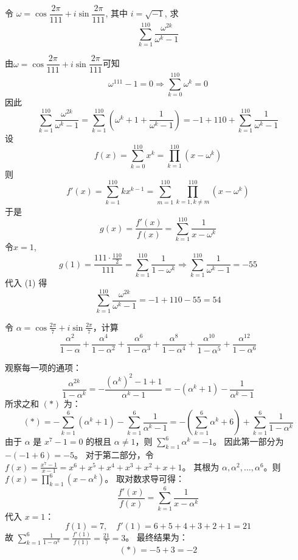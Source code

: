 \begin{questions}
    \question 令 $\omega = \cos\dfrac{2\pi}{111} + i \sin\dfrac{2\pi}{111}$, 其中 $i = \sqrt{-1}$, 求 \[ 
    \sum_{k=1}^{110} \frac{\omega^{2k}}{\omega^k - 1}
    \]
    \begin{solution}
        由$\omega = \cos\dfrac{2\pi}{111} + i \sin\dfrac{2\pi}{111}$可知
        \[
        \omega^{111}-1 = 0 \Rightarrow \sum_{k=0}^{110} \omega^k = 0
        \]
        因此
        \[
        \sum_{k=1}^{110} \frac{\omega^{2k}}{\omega^k - 1} = \sum_{k=1}^{110} \left(\omega^k + 1 + \frac{1}{\omega^k - 1}\right) = -1 + 110 + \sum_{k=1}^{110} \frac{1}{\omega^k - 1} \tag{1}
        \]
        设 
        \[f(x) = \sum_{k=0}^{110} x^k = \prod_{k=1}^{110} (x - \omega^k)
        \]
        则
        \[ f'(x) = \sum_{k=1}^{110} k x^{k-1} = \sum_{m=1}^{110} \prod_{k=1, k\ne m}^{110} (x - \omega^k)
        \]
        于是
        \[
        g(x) = \frac{f'(x)}{f(x)} = \sum_{k=1}^{110} \frac{1}{x - \omega^k}
        \]
        令$x=1$,
        \[
        g(1) = \frac{111 \cdot \frac{110}{2}}{111} = \sum_{k=1}^{110} \frac{1}{1 - \omega^k}\Rightarrow \sum_{k=1}^{110} \frac{1}{\omega^k - 1} = -55
        \]
        代入 (1) 得
        \[
        \sum_{k=1}^{110} \frac{\omega^{2k}}{\omega^k - 1} = -1 + 110 - 55 = 54
        \]
    \end{solution}

    \question 令 $\alpha = \cos \frac{2\pi}{7} + i \sin \frac{2\pi}{7}$，计算
\[
\frac{\alpha^2}{1-\alpha} + \frac{\alpha^4}{1-\alpha^2} + \frac{\alpha^6}{1-\alpha^3} + \frac{\alpha^8}{1-\alpha^4} + \frac{\alpha^{10}}{1-\alpha^5} + \frac{\alpha^{12}}{1-\alpha^6}
\]

\begin{solution}
观察每一项的通项：
\[
\frac{\alpha^{2k}}{1 - \alpha^k} = - \frac{(\alpha^k)^2 - 1 + 1}{\alpha^k - 1} = - (\alpha^k + 1) - \frac{1}{\alpha^k - 1}
\]
所求之和 $(*)$ 为：
\[
(*) = - \sum_{k=1}^{6} (\alpha^k + 1) - \sum_{k=1}^{6} \frac{1}{\alpha^k - 1} = - \left( \sum_{k=1}^{6} \alpha^k + 6 \right) + \sum_{k=1}^{6} \frac{1}{1 - \alpha^k}
\]
由于 $\alpha$ 是 $x^7 - 1 = 0$ 的根且 $\alpha \neq 1$，则 $\sum_{k=1}^{6} \alpha^k = -1$。
因此第一部分为 $-(-1 + 6) = -5$。
对于第二部分，令 $f(x) = \frac{x^7 - 1}{x - 1} = x^6 + x^5 + x^4 + x^3 + x^2 + x + 1$。
其根为 $\alpha, \alpha^2, \dots, \alpha^6$。则 $f(x) = \prod_{k=1}^{6} (x - \alpha^k)$。
取对数求导可得：
\[
\frac{f'(x)}{f(x)} = \sum_{k=1}^{6} \frac{1}{x - \alpha^k}
\]
代入 $x = 1$：
\[
f(1) = 7, \quad f'(1) = 6 + 5 + 4 + 3 + 2 + 1 = 21
\]
故 $\sum_{k=1}^{6} \frac{1}{1 - \alpha^k} = \frac{f'(1)}{f(1)} = \frac{21}{7} = 3$。
最终结果为：
\[
(*) = -5 + 3 = -2
\]
\end{solution}


\end{questions}
